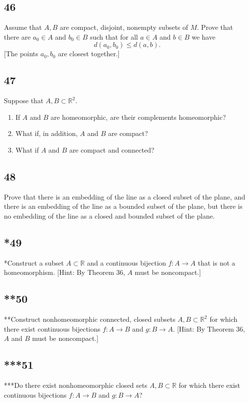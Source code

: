 \documentclass{amsart}
\begin{document}
\subsection*{46}
Assume that $A, B$ are compact, disjoint, nonempty subsets of $M$. Prove that there are $a_0 \in A$ and $b_0 \in B$ such that for all $a \in A$ and $b \in B$ we have
\[
d(a_0,b_0) \le d(a,b).
\]
[The points $a_0, b_0$ are closest together.]

\subsection*{47}
Suppose that $A, B \subset \mathbb{R}^2$.
\begin{enumerate}[label=(\alph*)]
\item If $A$ and $B$ are homeomorphic, are their complements homeomorphic?
\item[*(b)] What if, in addition, $A$ and $B$ are compact?
\item[***(c)] What if $A$ and $B$ are compact and connected?
\end{enumerate}

\subsection*{48}
Prove that there is an embedding of the line as a closed subset of the plane, and there is an embedding of the line as a bounded subset of the plane, but there is no embedding of the line as a closed and bounded subset of the plane.

\subsection*{*49}
*Construct a subset $A \subset \mathbb{R}$ and a continuous bijection $f : A \to A$ that is not a homeomorphism. [Hint: By Theorem 36, $A$ must be noncompact.]

\subsection*{**50}
**Construct nonhomeomorphic connected, closed subsets $A, B \subset \mathbb{R}^2$ for which there exist continuous bijections $f : A \to B$ and $g : B \to A$. [Hint: By Theorem 36, $A$ and $B$ must be noncompact.]

\subsection*{***51}
***Do there exist nonhomeomorphic closed sets $A, B \subset \mathbb{R}$ for which there exist continuous bijections $f : A \to B$ and $g : B \to A$?
\end{document}
